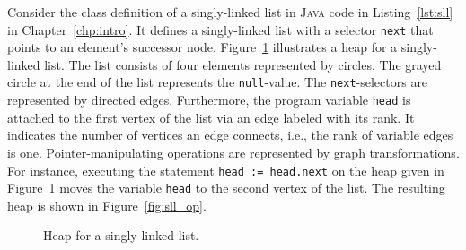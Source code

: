 \documentclass[a4paper, 12pt, twoside]{report}
\begin{document}
	Consider the class definition of a singly-linked list in \textsc{Java} code in Listing~\ref{lst:sll} in Chapter~\ref{chp:intro}. It defines a singly-linked list with a selector \texttt{next} that points to an element's successor node. Figure~\ref{fig:sll} illustrates a heap for a singly-linked list. The list consists of four elements represented by circles. The grayed circle at the end of the list represents the \texttt{null}-value. The \texttt{next}-selectors are represented by directed edges. Furthermore, the program variable \texttt{head} is attached to the first vertex of the list via an edge labeled with its rank. It indicates the number of vertices an edge connects, i.e., the rank of variable edges is one. Pointer-manipulating operations are represented by graph transformations. For instance, executing the statement \texttt{head := head.next} on the heap given in Figure~\ref{fig:sll} moves the variable \texttt{head} to the second vertex of the list. The resulting heap is shown in Figure~\ref{fig:sll_op}.\\ 		

	\begin{figure}
		\begin{center}
			\caption{Heap for a singly-linked list.}\label{fig:sll}
		\end{center}
	\end{figure}	
	
\end{document}
